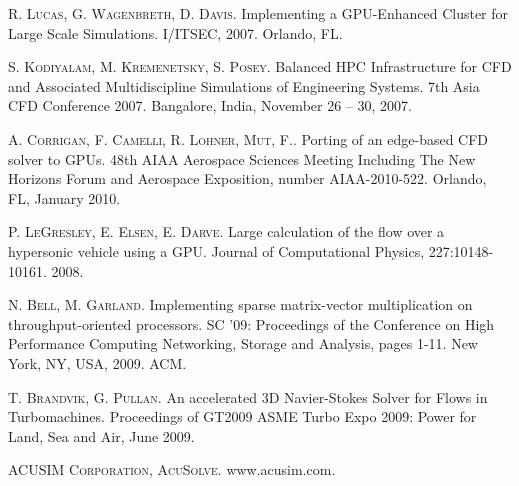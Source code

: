 
\begin{thebibliography}{10}
\textsc{R. Lucas, G. Wagenbreth, D. Davis}. {Implementing a GPU-Enhanced Cluster for Large Scale Simulations}. I/ITSEC, 2007. Orlando, FL.  

\textsc{S. Kodiyalam, M. Kremenetsky, S. Posey}. {Balanced HPC Infrastructure for CFD and Associated Multidiscipline Simulations of Engineering Systems}. 7th Asia CFD Conference 2007. Bangalore, India, November 26 – 30, 2007.

\textsc{A. Corrigan, F. Camelli, R. Lohner, Mut, F.}. {Porting of an edge-based CFD solver to GPUs}. 48th AIAA Aerospace Sciences Meeting Including The New Horizons Forum and Aerospace Exposition, number AIAA-2010-522. Orlando, FL, January 2010.

\textsc{P. LeGresley, E. Elsen, E. Darve}. {Large calculation of the flow over a hypersonic vehicle using a GPU}. Journal of Computational Physics, 227:10148-10161. 2008.

\textsc{N. Bell, M. Garland}. {Implementing sparse matrix-vector multiplication on throughput-oriented processors}. SC '09: Proceedings of the Conference on High Performance Computing Networking, Storage and Analysis, pages 1-11. New York, NY, USA, 2009. ACM.

\textsc{T. Brandvik, G. Pullan}. {An accelerated 3D Navier-Stokes Solver for Flows in Turbomachines}. Proceedings of GT2009 ASME Turbo Expo 2009: Power for Land, Sea and Air, June 2009.

\textsc{ACUSIM Corporation, AcuSolve}. www.acusim.com.
\end{thebibliography}